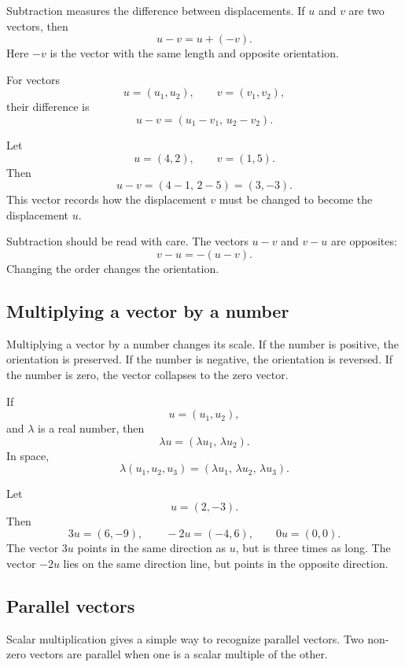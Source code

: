 Subtraction measures the difference between displacements. If \(u\) and \(v\) are two vectors, then
\[
u-v=u+(-v).
\]
Here \(-v\) is the vector with the same length and opposite orientation.

\begin{definitionbox}
For vectors
\[
u=(u_1,u_2),
\qquad
v=(v_1,v_2),
\]
their difference is
\[
u-v=(u_1-v_1,\,u_2-v_2).
\]
\end{definitionbox}

\begin{examplebox}
Let
\[
u=(4,2),
\qquad
v=(1,5).
\]
Then
\[
u-v=(4-1,\,2-5)=(3,-3).
\]
This vector records how the displacement \(v\) must be changed to become the displacement \(u\).
\end{examplebox}

Subtraction should be read with care. The vectors \(u-v\) and \(v-u\) are opposites:
\[
v-u=-(u-v).
\]
Changing the order changes the orientation.

\subsection*{Multiplying a vector by a number}

Multiplying a vector by a number changes its scale. If the number is positive, the orientation is preserved. If the number is negative, the orientation is reversed. If the number is zero, the vector collapses to the zero vector.

\begin{definitionbox}
If
\[
u=(u_1,u_2),
\]
and \(\lambda\) is a real number, then
\[
\lambda u=(\lambda u_1,\,\lambda u_2).
\]
In space,
\[
\lambda(u_1,u_2,u_3)=(\lambda u_1,\,\lambda u_2,\,\lambda u_3).
\]
\end{definitionbox}

\begin{examplebox}
Let
\[
u=(2,-3).
\]
Then
\[
3u=(6,-9),
\qquad
-2u=(-4,6),
\qquad
0u=(0,0).
\]
The vector \(3u\) points in the same direction as \(u\), but is three times as long. The vector \(-2u\) lies on the same direction line, but points in the opposite direction.
\end{examplebox}

\subsection*{Parallel vectors}

Scalar multiplication gives a simple way to recognize parallel vectors. Two non-zero vectors are parallel when one is a scalar multiple of the other.

